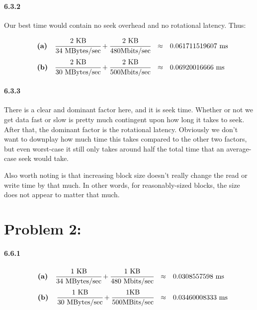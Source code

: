 \documentclass[a4paper]{article}
\begin{document}
\paragraph{6.3.2}
Our best time would contain no seek overhead and no rotational latency. Thus:

\begin{equation}
\begin{array}{llrll}
& \textbf{(a)} & \cfrac{2 \mbox{ KB}}{34 \mbox{ MBytes/sec}} + \cfrac{2 \mbox{ KB}}{480 \mbox{Mbits/sec}} & \approx & 0.061711519607 \mbox{ ms} \\[.15in]
& \textbf{(b)} & \cfrac{2 \mbox{ KB}}{30 \mbox{ MBytes/sec}} + \cfrac{2 \mbox{ KB}}{500 \mbox{Mbits/sec}} & \approx & 0.06920016666 \mbox{ ms}
\end{array}
\end{equation}

\paragraph{6.3.3} There is a clear and dominant factor here, and it is seek time. Whether or not we get data fast or slow is pretty much contingent upon how long it takes to seek. After that, the dominant factor is the rotational latency. Obviously we don't want to downplay how much time this takes compared to the other two factors, but even worst-case it still only takes around half the total time that an average-case seek would take.

Also worth noting is that increasing block size doesn't really change the read or write time by that much. In other words, for reasonably-sized blocks, the size does not appear to matter that much.

\section*{Problem 2:}

\paragraph{6.6.1} 

\begin{equation}
\begin{array}{llrll}
& \textbf{(a)} & \cfrac{1 \mbox{ KB}}{34 \mbox{ MBytes/sec}} + \cfrac{1 \mbox{ KB}}{480 \mbox{ Mbits/sec}} & \approx & 0.0308557598 \mbox{ ms} \\[.15in]
& \textbf{(b)} & \cfrac{1 \mbox{ KB}}{30 \mbox{ MBytes/sec}} + \cfrac{1 \mbox{KB}}{500 \mbox{MBits/sec}} & \approx & 0.03460008333 \mbox{ ms}
\end{array}
\end{equation}
\end{document}
